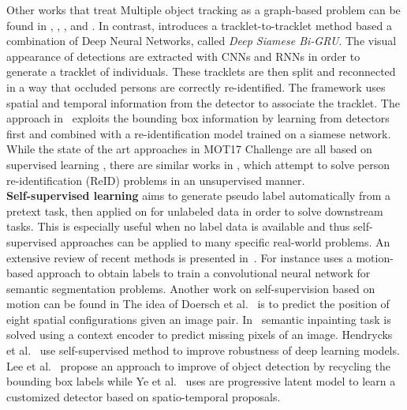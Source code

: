 Other works that treat Multiple object tracking as a graph-based problem can be found in \cite{henschel2017improvements}, \cite{keuper2015efficient}, \cite{keuper2016multi}, \cite{kumar2014multiple} and \cite{zamir2012gmcp}.
In contrast, \cite{ma2018trajectory} introduces a tracklet-to-tracklet method based a combination of Deep Neural Networks, called \textit{Deep Siamese Bi-GRU}. 
The visual appearance of detections are extracted with CNNs and RNNs in order to generate a tracklet of individuals.
These tracklets are then split and reconnected in a way that occluded persons are correctly re-identified. 
The framework uses spatial and temporal information from the detector to associate the tracklet. 
The approach in~\cite{bergmann2019tracking} exploits the bounding box information by learning from detectors first and combined with a re-identification model trained on a siamese network. 
While the state of the art approaches in MOT17 Challenge are all based on supervised learning \cite{henschel2018fusion, keuper2018motion, kim2015multiple, 8533372, chen2017enhancing}, there are similar works in \cite{li2018unsupervised, lv2018unsupervised}, which attempt to solve person re-identification (ReID) problems in an unsupervised manner.\\

\noindent\textbf{Self-supervised learning} aims to generate pseudo label automatically from a pretext task, then applied on for unlabeled data in order to solve downstream tasks. 
This is especially useful when no label data is available and thus self-supervised approaches can be applied to many specific real-world problems. An extensive review of recent methods is presented in~\cite{jing2019self}. 
For instance \cite{pathak2017learning} uses a motion-based approach to obtain labels to train a convolutional neural network for semantic segmentation problems.
Another work on self-supervision based on motion can be found in \cite{mahendran2018cross}
The idea of Doersch et al.~\cite{doersch2015unsupervised} is to predict the position of eight spatial configurations given an image pair.
In~\cite{pathak2016context} semantic inpainting task is solved using a context encoder to predict missing pixels of an image.
Hendrycks et al.~\cite{hendrycks2019using} use self-supervised method to improve robustness of deep learning models.
Lee et al.~\cite{lee2019multi} propose an approach to improve of object detection by recycling the
bounding box labels while Ye et al.~\cite{ye2017self} uses are progressive latent model to learn a customized detector based on spatio-temporal proposals.